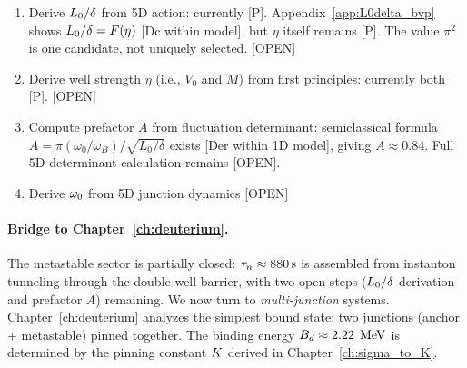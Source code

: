 \begin{edcopenbox}[title=Open Problems]
    \begin{enumerate}
        \item Derive $L_0/\delta$ from 5D action: currently [P].
              Appendix~\ref{app:L0delta_bvp} shows $L_0/\delta = F(\eta)$
              [Dc within model], but $\eta$ itself remains [P]. The value $\pi^2$
              is one candidate, not uniquely selected. [OPEN]
        \item Derive well strength $\eta$ (i.e., $V_0$ and $M$) from
              first principles: currently both [P]. [OPEN]
        \item Compute prefactor $A$ from fluctuation determinant:
              semiclassical formula $A = \pi(\omega_0/\omega_B)/\sqrt{L_0/\delta}$
              exists [Der within 1D model], giving $A \approx 0.84$.
              Full 5D determinant calculation remains [OPEN].
        \item Derive $\omega_0$ from 5D junction dynamics [OPEN]
    \end{enumerate}
    \tagOpen
\end{edcopenbox}

\paragraph{Bridge to Chapter~\ref{ch:deuterium}.}
The metastable sector is partially closed: $\tau_n \approx 880\,\mathrm{s}$ is assembled
from instanton tunneling through the double-well barrier, with two open steps
($L_0/\delta$ derivation and prefactor $A$) remaining. We now turn to
\emph{multi-junction} systems. Chapter~\ref{ch:deuterium} analyzes the simplest
bound state: two junctions (anchor + metastable) pinned together. The
binding energy $B_d \approx 2.22\;\,\mathrm{MeV}$ is determined by the pinning constant
$K$ derived in Chapter~\ref{ch:sigma_to_K}.

